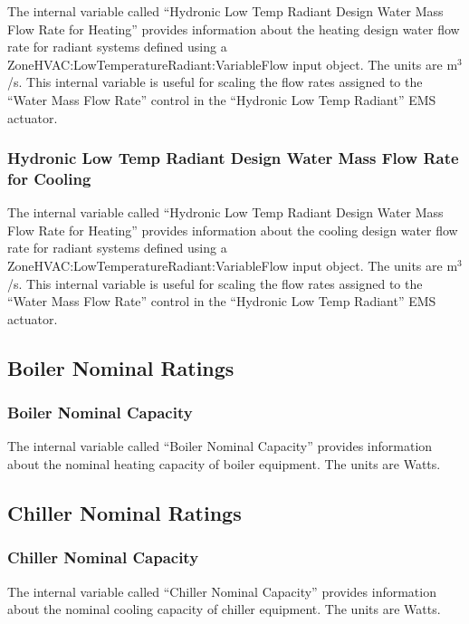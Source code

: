 The internal variable called ``Hydronic Low Temp Radiant Design Water Mass Flow Rate for Heating'' provides information about the heating design water flow rate for radiant systems defined using a ZoneHVAC:LowTemperatureRadiant:VariableFlow input object. The units are m\(^{3}\)/s. This internal variable is useful for scaling the flow rates assigned to the ``Water Mass Flow Rate'' control in the ``Hydronic Low Temp Radiant'' EMS actuator.

\subsubsection{Hydronic Low Temp Radiant Design Water Mass Flow Rate for Cooling}\label{hydronic-low-temp-radiant-design-water-mass-flow-rate-for-cooling}

The internal variable called ``Hydronic Low Temp Radiant Design Water Mass Flow Rate for Heating'' provides information about the cooling design water flow rate for radiant systems defined using a ZoneHVAC:LowTemperatureRadiant:VariableFlow input object. The units are m\(^{3}\)/s. This internal variable is useful for scaling the flow rates assigned to the ``Water Mass Flow Rate'' control in the ``Hydronic Low Temp Radiant'' EMS actuator.

\subsection{Boiler Nominal Ratings}\label{boiler-nominal-ratings}

\subsubsection{Boiler Nominal Capacity}\label{boiler-nominal-capacity}

The internal variable called ``Boiler Nominal Capacity'' provides information about the nominal heating capacity of boiler equipment. The units are Watts.

\subsection{Chiller Nominal Ratings}\label{chiller-nominal-ratings}

\subsubsection{Chiller Nominal Capacity}\label{chiller-nominal-capacity}

The internal variable called ``Chiller Nominal Capacity'' provides information about the nominal cooling capacity of chiller equipment. The units are Watts.

